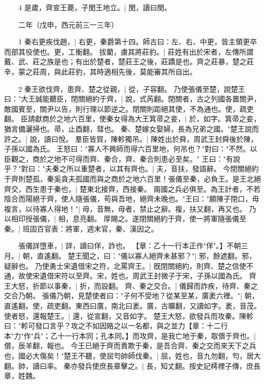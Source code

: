 　　4 是歲，齊宣王薨，子閔王地立。|{
	閔，讀曰閔。
	}

　　二年（戊申，西元前三一三年）

　　1 秦右更疾伐趙，|{
	右更，秦爵第十四。師古曰：左、右、中更，皆主領更卒而部其役使也。更，工衡翻。
	}
拔藺，虜其將莊豹。|{
	莊姓有出於宋者，左傳所謂戴、武、莊之族是也；有出於楚者，楚莊王之後，莊蹻是也。齊之莊暴，楚之莊辛，蒙之莊周，與此莊豹，其時適相先後，莫能審其所自出。
	}

　　2 秦王欲伐齊，患齊、楚之從親，|{
	從，子容翻。
	}
乃使張儀至楚，說楚王曰："大王誠能聽臣，閉關絕約于齊，|{
	說，式芮翻。閉關者，古之列國各置關尹，敵國賓至，關尹以告，則行理以節逆之。閉關則距絕其使，不為通也。使，疏吏翻。
	}
臣請獻商於之地六百里，使秦女得為大王箕帚之妾，|{
	於，如字。箕帚之妾，猶言備灑掃也。帚，止酉翻，彗也。
	}
秦、楚嫁女娶婦，長為兄弟之國。"楚王說而許之。|{
	說，讀曰悅。
	}
羣臣皆賀，陳軫獨吊。|{
	陳姓出於舜，周武王封舜後於陳，子孫以國為氏。
	}
王怒曰："寡人不興師而得六百里地，何吊也？"對曰："不然。以臣觀之，商於之地不可得而齊、秦合，齊、秦合則患必至矣。" 王曰："有說乎？"對曰："夫秦之所以重楚者，以其有齊也。|{
	夫，音扶，發語辭。
	}
今閉關絕約于齊則楚孤，秦奚貪夫孤國而與之商於之地六百里！張儀至秦，必負王。是王北絕齊交，西生患于秦也，|{
	楚東北接齊，西接秦。
	}
兩國之兵必俱至。為王計者，不若陰合而陽絕于齊，使人隨張儀，苟與吾地，絕齊未晚也。"王曰："願陳子閉口，毋複言，以待寡人得地！"|{
	毋，音無，毋者，禁止之辭。複，扶又翻，再又也。
	}
乃以相印授張儀，|{
	相，息亮翻。
	}
厚賜之。遂閉關絕約于齊，使一將軍隨張儀至秦。|{
	班固百官表：將軍，週末官，秦、漢因之。
	}

　　張儀詳墮車，|{
	詳，讀曰佯，詐也。
	}
【章：乙十一行本正作"佯"。】不朝三月。|{
	朝，直遙翻。
	}
楚王聞之，曰："儀以寡人絕齊未甚邪？"|{
	邪，餘遮翻。邪，疑辭也。
	}
乃使勇士宋遺借宋之符，北罵齊王。|{
	旣閉關絕約，則齊、楚之信使不通，故使宋遺借宋符以至齊。宋，姓也。周武王封微子于宋，子孫以國為氏。
	}
齊王大怒，折節以事秦，|{
	折，而設翻。
	}
齊、秦之交合。|{
	儀歸而詐疾，待齊、秦之交合乃朝。
	}
張儀乃朝，見楚使者曰："子何不受地？從某至某，廣袤六裡。"|{
	朝，直遙翻。使，疏吏翻。東西曰廣，南北曰袤。廣，古曠翻，又讀如字。袤，音茂。
	}
使者怒，還報楚王。|{
	還，從宣翻，又音如字。
	}
楚王大怒，欲發兵而攻秦。陳軫曰："軫可發口言乎？攻之不如因賂之以一名都，與之並力【章：十二行本"力"作"兵"；乙十一行本同；孔本同。】而攻齊，是我亡地于秦，取償于齊也。|{
	償，辰羊翻，報也。
	}
今王已絕于齊而責欺于秦，是吾合齊、秦之交而來天下之兵也，國必大傷矣！"楚王不聽，使屈匄帥師伐秦。|{
	屈，姓也，音九勿翻，匄，居大翻。帥，讀曰率。
	}
秦亦發兵使庶長章擊之。|{
	長，知丈翻。按史記樗裡子傳，庶長章，姓魏。
	}

